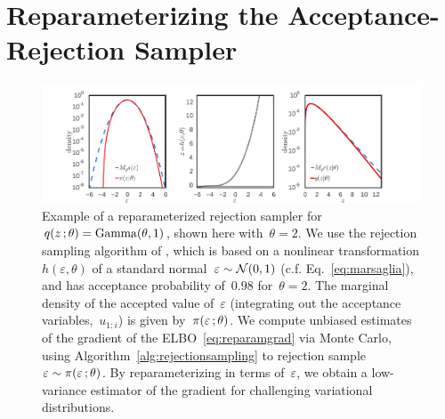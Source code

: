
\section{Reparameterizing the Acceptance-Rejection Sampler}\label{sec:method}


\begin{figure}[t]
  \centering
  \includegraphics[width=6.5in]{real_gamma} 
  \caption{Example of a reparameterized rejection sampler for~${q(z \, ;
      \theta)= \operatorname*{Gamma}(\theta,1)}$, shown here with~${\theta = 2}$.  We
    use the rejection sampling algorithm of \citet{Marsaglia:2000},
    which is based on a nonlinear transformation ${h(\varepsilon,
      \theta)}$ of a standard normal~${\varepsilon \sim \mathcal{N}(0,1)}$
    (c.f. Eq.~\ref{eq:marsaglia}), and has acceptance probability
    of~$0.98$ for~${\theta=2}$. The marginal density of the accepted
    value of~$\varepsilon$ (integrating out the acceptance
    variables,~$u_{1:i}$) is given by~${\pi(\varepsilon \, ;
      \theta)}$. We compute unbiased estimates of the gradient of the
    \gls{ELBO}~\eqref{eq:reparamgrad} via Monte Carlo, using
    Algorithm~\ref{alg:rejectionsampling} to rejection
    sample~${\varepsilon \sim \pi(\varepsilon \, ; \theta)}$. By
    reparameterizing in terms of~$\varepsilon$, we obtain a
    low-variance estimator of the gradient for challenging
    variational distributions.}
  \label{fig:real_gamma}
\end{figure}


